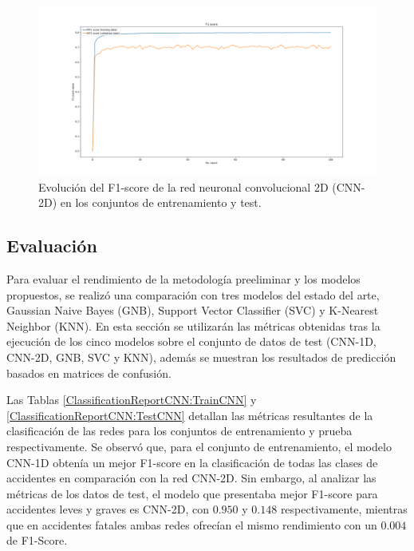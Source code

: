 \documentclass{uathesis-es}
\begin{document}
{\begin{figure}[H]
	\centering
	\includegraphics[width=14cm]{Figures/1stPaper/F1Score2D}
	\caption{Evolución del F1-score de la red neuronal convolucional 2D (CNN-2D) en los conjuntos de entrenamiento y test.}
	\label{F1ScoreEvolution:2D}
\end{figure}


\subsection*{Evaluación}

Para evaluar el rendimiento de la metodología preeliminar y los modelos propuestos, se realizó una comparación con tres modelos del estado del arte, Gaussian Naive Bayes (GNB), Support Vector Classifier (SVC) y K-Nearest Neighbor (KNN). En esta sección se utilizarán las métricas obtenidas tras la ejecución de los cinco modelos sobre el conjunto de datos de test (CNN-1D, CNN-2D, GNB, SVC y KNN), además se muestran los resultados de predicción basados en matrices de confusión.


Las Tablas \ref{ClassificationReportCNN:TrainCNN} y \ref{ClassificationReportCNN:TestCNN} detallan las métricas resultantes de la clasificación de las redes para los conjuntos de entrenamiento y prueba respectivamente. Se observó que, para el conjunto de entrenamiento, el modelo CNN-1D obtenía un mejor F1-score en la clasificación de todas las clases de accidentes en comparación con la red CNN-2D. Sin embargo, al analizar las métricas de los datos de test, el modelo que presentaba mejor F1-score para accidentes leves y graves es CNN-2D, con $0.950$ y $0.148$ respectivamente, mientras que en accidentes fatales ambas redes ofrecían el mismo rendimiento con un $0.004$ de F1-Score.

}
\end{document}
